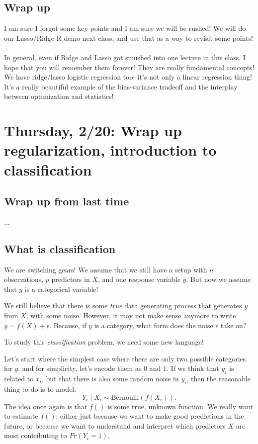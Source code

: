 \subsection{Wrap up}

I am sure I forgot some key points and I am sure we will be rushed! We will do our Lasso/Ridge R demo next class, and use that as a way to revisit some points! \\
\\
In general, even if Ridge and Lasso got smushed into one lecture in this class, I hope that you will remember them forever! They are really fundamental concepts! We have ridge/lasso logistic regression too- it's not only a linear regression thing! It's a really beautiful example of the bias-variance tradeoff and the interplay between optimization and statistics!

\section{Thursday, 2/20: Wrap up regularization, introduction to classification}

\subsection{Wrap up from last time}

...

\subsection{What is classification}

We are switching gears! We assume that we still have a setup with $n$ observations, $p$ predictors in $X$, and one response variable $y$. But now we assume that $y$ is a categorical variable! 

We still believe that there is some \emph{true} data generating process that generates $y$ from $X$, with some noise. However, it may not make sense anymore to write $y = f(X) + \epsilon$. Because, if $y$ is a category, what form does the noise $\epsilon$ take on?

To study this \emph{classification} problem, we need some new language! 

Let's start where the simplest case where there are only two possible categories for $y$, and for simplicity, let's encode them as $0$ and $1$. If we think that $y_i$ is related to $x_i$, but that there is also some random noise in $y_i$, then the reasonable thing to do is to model: 
$$
Y_i \mid X_i \sim \mathrm{Bernoulli}\left( f(X_i) \right). 
$$
The idea once again is that $f()$ is some true, unknown function. We really want to estimate $f()$: either just because we want to make good predictions in the future, or because we want to understand and interpret which predictors $X$ are most contributing to $Pr(Y_i=1)$. 





